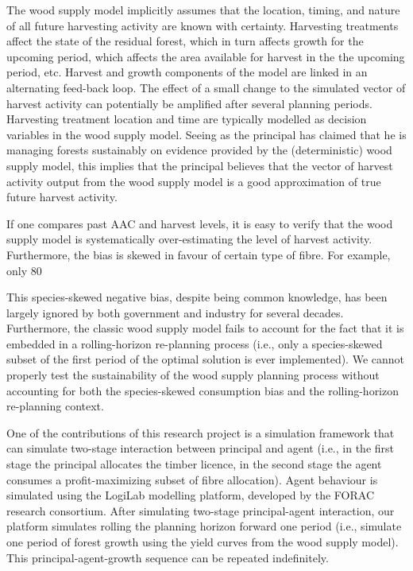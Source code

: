 The wood supply model implicitly assumes that the location, timing, and nature of all future harvesting activity are known with certainty. Harvesting treatments affect the state of the residual forest, which in turn affects growth for the upcoming period, which affects the area available for harvest in the the upcoming period, etc. Harvest and growth components of the model are linked in an alternating feed-back loop. The effect of a small change to the simulated vector of harvest activity can potentially be amplified after several planning periods. Harvesting treatment location and time are typically modelled as decision variables in the wood supply model. Seeing as the principal has claimed that he is managing forests sustainably on evidence provided by the (deterministic) wood supply model, this implies that the principal believes that the vector of harvest activity output from the wood supply model is a good approximation of true future harvest activity. 

If one compares past AAC and harvest levels, it is easy to verify that the wood supply model is systematically over-estimating the level of harvest activity. Furthermore, the bias is skewed in favour of certain type of fibre. For example, only 80%

This species-skewed negative bias, despite being common knowledge, has been largely ignored by both government and industry for several decades. Furthermore, the classic wood supply model fails to account for the fact that it is embedded in a rolling-horizon re-planning process (i.e., only a species-skewed subset of the first period of the optimal solution is ever implemented). We cannot properly test the sustainability of the wood supply planning process without accounting for both the species-skewed consumption bias and the rolling-horizon re-planning context.

One of the contributions of this research project is a simulation framework that can simulate two-stage interaction between principal and agent (i.e., in the first stage the principal allocates the timber licence, in the second stage the agent consumes a profit-maximizing subset of fibre allocation). Agent behaviour is simulated using the LogiLab modelling platform, developed by the FORAC research consortium. After simulating two-stage principal-agent interaction, our platform simulates rolling the planning horizon forward one period (i.e., simulate one period of forest growth using the yield curves from the wood supply model). This principal-agent-growth sequence can be repeated indefinitely. 

